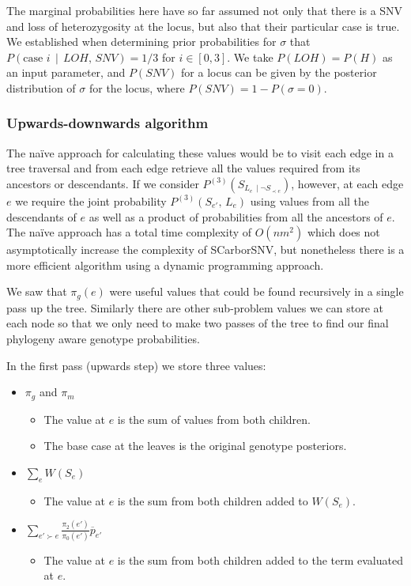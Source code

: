 \documentclass[../../main.tex]{subfiles}
\begin{document}
The marginal probabilities here have so far assumed not only that there is a SNV and loss of heterozygosity at the locus, but also that their particular case is true.
We established when determining prior probabilities for $\sigma$ that $P(\text{case }i\,\mid\,LOH,\,SNV) = 1/3$ for $i\in[0,3]$.
We take $P(LOH) = P(H)$ as an input parameter, and $P(SNV)$ for a locus can be given by the posterior distribution of $\sigma$ for the locus, where $P(SNV) = 1-P(\sigma=0)$.

\subsubsection*{Upwards-downwards algorithm}
The na\"ive approach for calculating these values would be to visit each edge in a tree traversal and from each edge retrieve all the values required from its ancestors or descendants.
If we consider $P^{(3)}(S_{L_e\,\mid\neg S_{\prec e}})$, however, at each edge $e$ we require the joint probability $P^{(3)}(S_{e'},\,L_e)$ using values from all the descendants of $e$ as well as a product of probabilities from all the ancestors of $e$.
The na\"ive approach has a total time complexity of $O(nm^2)$ which does not asymptotically increase the complexity of SCarborSNV, but nonetheless there is a more efficient algorithm using a dynamic programming approach.

We saw that $\pi_g(e)$ were useful values that could be found recursively in a single pass up the tree.
Similarly there are other sub-problem values we can store at each node so that we only need to make two passes of the tree to find our final phylogeny aware genotype probabilities.

In the first pass (upwards step) we store three values:
\begin{itemize}
    \item $\pi_g$ and $\pi_m$
        \begin{itemize}
            \item The value at $e$ is the sum of values from both children.
            \item The base case at the leaves is the original genotype posteriors.
        \end{itemize}
    \item $\sum_e W(S_e)$
        \begin{itemize}
            \item The value at $e$ is the sum from both children added to $W(S_e)$.
        \end{itemize}
    \item $\sum_{e'\succ e} \frac{\pi_2(e')}{\pi_0(e')}\overline{p}_{e'}$
        \begin{itemize}
            \item The value at $e$ is the sum from both children added to the term evaluated at $e$.
        \end{itemize}
\end{itemize}
\end{document}
